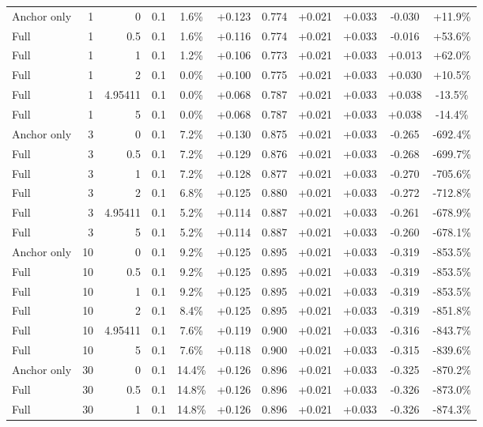 \begin{table}[htbp]
\begin{tabular}{lrrrccccccc}
Anchor only & 1 & 0 & 0.1 & 1.6\% & +0.123 & 0.774 & +0.021 & +0.033 & -0.030 & +11.9\% \\
Full & 1 & 0.5 & 0.1 & 1.6\% & +0.116 & 0.774 & +0.021 & +0.033 & -0.016 & +53.6\% \\
Full & 1 & 1 & 0.1 & 1.2\% & +0.106 & 0.773 & +0.021 & +0.033 & +0.013 & +62.0\% \\
Full & 1 & 2 & 0.1 & 0.0\% & +0.100 & 0.775 & +0.021 & +0.033 & +0.030 & +10.5\% \\
Full & 1 & 4.95411 & 0.1 & 0.0\% & +0.068 & 0.787 & +0.021 & +0.033 & +0.038 & -13.5\% \\
Full & 1 & 5 & 0.1 & 0.0\% & +0.068 & 0.787 & +0.021 & +0.033 & +0.038 & -14.4\% \\
Anchor only & 3 & 0 & 0.1 & 7.2\% & +0.130 & 0.875 & +0.021 & +0.033 & -0.265 & -692.4\% \\
Full & 3 & 0.5 & 0.1 & 7.2\% & +0.129 & 0.876 & +0.021 & +0.033 & -0.268 & -699.7\% \\
Full & 3 & 1 & 0.1 & 7.2\% & +0.128 & 0.877 & +0.021 & +0.033 & -0.270 & -705.6\% \\
Full & 3 & 2 & 0.1 & 6.8\% & +0.125 & 0.880 & +0.021 & +0.033 & -0.272 & -712.8\% \\
Full & 3 & 4.95411 & 0.1 & 5.2\% & +0.114 & 0.887 & +0.021 & +0.033 & -0.261 & -678.9\% \\
Full & 3 & 5 & 0.1 & 5.2\% & +0.114 & 0.887 & +0.021 & +0.033 & -0.260 & -678.1\% \\
Anchor only & 10 & 0 & 0.1 & 9.2\% & +0.125 & 0.895 & +0.021 & +0.033 & -0.319 & -853.5\% \\
Full & 10 & 0.5 & 0.1 & 9.2\% & +0.125 & 0.895 & +0.021 & +0.033 & -0.319 & -853.5\% \\
Full & 10 & 1 & 0.1 & 9.2\% & +0.125 & 0.895 & +0.021 & +0.033 & -0.319 & -853.5\% \\
Full & 10 & 2 & 0.1 & 8.4\% & +0.125 & 0.895 & +0.021 & +0.033 & -0.319 & -851.8\% \\
Full & 10 & 4.95411 & 0.1 & 7.6\% & +0.119 & 0.900 & +0.021 & +0.033 & -0.316 & -843.7\% \\
Full & 10 & 5 & 0.1 & 7.6\% & +0.118 & 0.900 & +0.021 & +0.033 & -0.315 & -839.6\% \\
Anchor only & 30 & 0 & 0.1 & 14.4\% & +0.126 & 0.896 & +0.021 & +0.033 & -0.325 & -870.2\% \\
Full & 30 & 0.5 & 0.1 & 14.8\% & +0.126 & 0.896 & +0.021 & +0.033 & -0.326 & -873.0\% \\
Full & 30 & 1 & 0.1 & 14.8\% & +0.126 & 0.896 & +0.021 & +0.033 & -0.326 & -874.3\% \\

\end{tabular}
\end{table}
